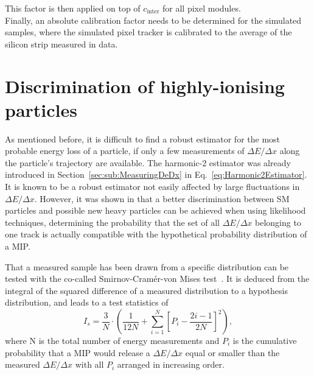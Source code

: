 This factor is then applied on top of $c_{\text{inter}}$ for all pixel modules.\\

Finally, an absolute calibration factor needs to be determined for the simulated samples, where the simulated pixel tracker is calibrated to the average \dedx of the silicon strip measured in data.

\section{Discrimination of highly-ionising particles}
\label{sec:Ias}

As mentioned before, it is difficult to find a robust estimator for the most probable energy loss of a particle, if only a few measurements of $\Delta E/ \Delta x$  along the particle's trajectory are available.
The harmonic-2 estimator \ihtwo was already introduced in Section~\ref{sec:sub:MeasuringDeDx} in Eq.~\eqref{eq:Harmonic2Estimator}.
It is known to be a robust estimator not easily affected by large fluctuations in $\Delta E/ \Delta x$.
However, it was shown in \cite{bib:Quertenmont_2010} that a better discrimination between SM particles and possible new heavy particles can be achieved when using likelihood techniques,
\ie determining the probability that the set of all $\Delta E/ \Delta x$ belonging to one track is actually compatible with the hypothetical probability distribution of a MIP.

That a measured sample has been drawn from a specific distribution can be tested with the co-called Smirnov-Cram\'{e}r-von Mises test~\cite{bib:Anderson:CramerVonMises_1962,bib:James:StaticticalMethods_2006}.
It is deduced from the integral of the squared difference of a measured distribution to a hypothesis distribution, 
and leads to a test statistics of~\cite{bib:Quertenmont_2010}
\begin{equation}
I_s = \frac{3}{N} \cdot \left( \frac{1}{12N} + \sum\limits_{i=1}^N \left[ P_i - \frac{2i-1}{2N} \right]^2 \right),
\end{equation}
where N is the total number of energy measurements and $P_i$ is the cumulative probability that a MIP would release a $\Delta E/\Delta x$ equal or smaller than the measured $\Delta E/ \Delta x$ with all $P_i$ arranged in increasing order.

